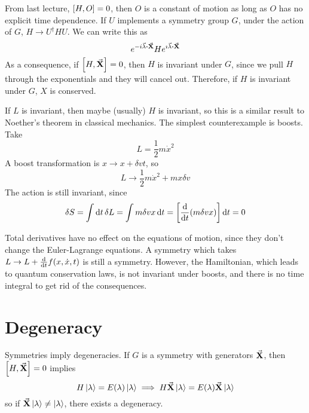 \documentclass[a4paper,twoside,master.tex]{subfiles}
\begin{document}

From last lecture, $ \comm{H}{O} = 0 $, then $ O $ is a constant of motion as long as $ O $ has no explicit time dependence. If $ U $ implements a symmetry group $ G $, under the action of $ G $, $ H \to U^\dagger H U $. We can write this as
\begin{equation}
    e^{-i \va{\lambda} \vdot\va{ X}} H e^{\imath \va{\lambda} \vdot\va{ X}} 
\end{equation}
As a consequence, if $ \comm{H}{\va{X}} = 0 $, then $ H $ is invariant under $ G $, since we pull $ H $ through the exponentials and they will cancel out. Therefore, if $ H $ is invariant under $ G $, $ X $ is conserved.

If $ L $ is invariant, then maybe (usually) $ H $ is invariant, so this is a similar result to Noether's theorem in classical mechanics. The simplest counterexample is boosts. Take
\begin{equation}
    L = \frac{1}{2} m \dot{x}^2
\end{equation}
A boost transformation is $ x \to x + \delta vt $, so
\begin{equation}
    L \to \frac{1}{2} m \dot{x}^2 + m x \delta v
\end{equation}
The action is still invariant, since
\begin{equation}
    \delta S = \int \dd{t} \delta L = \int m \delta v x \dd{t} = \left[ \dv{t}(m \delta vx) \right] \dd{t} = 0
\end{equation}

Total derivatives have no effect on the equations of motion, since they don't change the Euler-Lagrange equations. A symmetry which takes $ L \to L + \dv{t}f(x,\dot{x},t) $ is still a symmetry. However, the Hamiltonian, which leads to quantum conservation laws, is not invariant under boosts, and there is no time integral to get rid of the consequences.

\section{Degeneracy}
\label{sec:degeneracy}

Symmetries imply degeneracies. If $ G $ is a symmetry with generators $\va{ X} $, then $ \comm{H}{\va{X}} = 0 $ implies
\begin{equation}
    H\ket{\lambda} = E(\lambda)\ket{\lambda} \implies H\va{ X}\ket{\lambda} = E(\lambda)\va{ X}\ket{\lambda}
\end{equation}
so if $\va{ X}\ket{\lambda} \neq\ket{\lambda} $, there exists a degeneracy.
\end{document}
